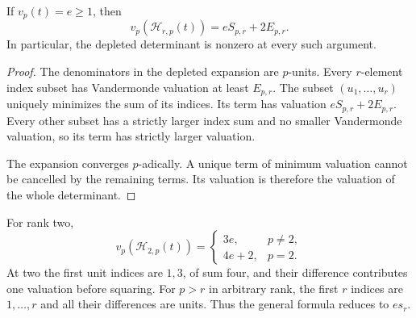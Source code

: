 \begin{theorem}\label{thm:depleted-valuation}
If $v_p(t)=e\ge1$, then
\[
 \boxed{v_p(\mathcal H_{r,p}(t))=eS_{p,r}+2E_{p,r}.}
\]
In particular, the depleted determinant is nonzero at every such argument.
\end{theorem}
\begin{proof}
The denominators in the depleted expansion are $p$-units. Every $r$-element index subset has Vandermonde valuation at least $E_{p,r}$. The subset $(u_1,\ldots,u_r)$ uniquely minimizes the sum of its indices. Its term has valuation $eS_{p,r}+2E_{p,r}$. Every other subset has a strictly larger index sum and no smaller Vandermonde valuation, so its term has strictly larger valuation.

The expansion converges $p$-adically. A unique term of minimum valuation cannot be cancelled by the remaining terms. Its valuation is therefore the valuation of the whole determinant.
\end{proof}
For rank two,
\[
 v_p(\mathcal H_{2,p}(t))=
 \begin{cases}3e,&p\ne2,\\4e+2,&p=2.\end{cases}
\]
At two the first unit indices are $1,3$, of sum four, and their difference contributes one valuation before squaring. For $p>r$ in arbitrary rank, the first $r$ indices are $1,\ldots,r$ and all their differences are units. Thus the general formula reduces to $es_r$.

